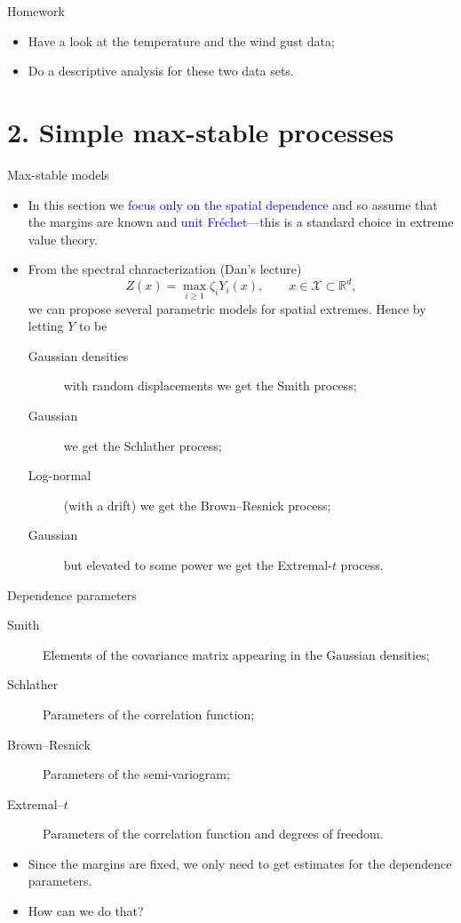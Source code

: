\documentclass[blackslide,style=simple]{powerdot}
\theoremstyle{plain}%
\theoremstyle{definition}
\theoremstyle{remark}
\begin{document}
\begin{slide}{Homework}
  \begin{itemize}
  \item Have a look at the temperature and the wind gust data;
  \item Do a descriptive analysis for these two data sets.
  \end{itemize}
\end{slide}

\section{2. Simple max-stable processes}
\label{sec:simple-max-stable}

\begin{slide}{Max-stable models}
  \begin{itemize}
  \item In this section we \textcolor{blue}{focus only on the spatial
      dependence} and so assume that the margins are known and
    \textcolor{blue}{unit Fréchet}---this is a standard choice in
    extreme value theory.
  \item From the spectral characterization (Dan's lecture)
    \begin{equation*}
      Z(x) = \max_{i \geq 1} \zeta_i Y_i(x), \qquad x \in \mathcal{X}
      \subset \mathbb{R}^d,
    \end{equation*}
    we can propose several parametric models for spatial
    extremes. Hence by letting $Y$ to be
    \begin{description}
    \item[Gaussian densities] with random displacements we get the
      Smith process;
    \item[Gaussian] we get the Schlather process;
    \item[Log-normal] (with a drift) we get the Brown--Resnick process;
    \item[Gaussian] but elevated to some power we get the Extremal-$t$
      process.
    \end{description}
  \end{itemize}
\end{slide}

\begin{slide}[toc=]{Dependence parameters}
  \begin{description}
  \item[Smith] Elements of the covariance matrix appearing in the
    Gaussian densities;
  \item[Schlather] Parameters of the correlation function;
  \item[Brown--Resnick] Parameters of the semi-variogram;
  \item[Extremal--$t$] Parameters of the correlation function and
    degrees of freedom.
  \end{description}
  \begin{itemize}
  \item Since the margins are fixed, we only need to get estimates for
    the dependence parameters.
  \item How can we do that?
  \end{itemize}
\end{slide}
\end{document}
